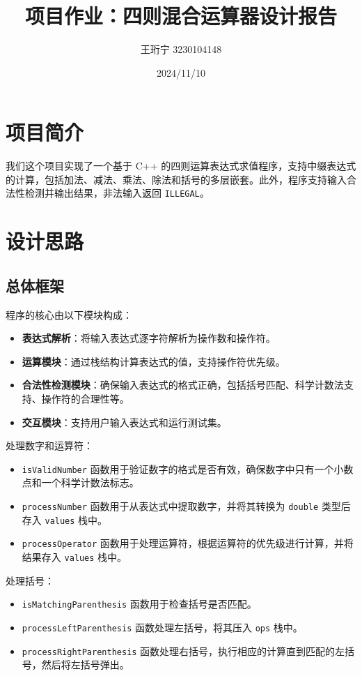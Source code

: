 \documentclass[12pt,a4paper]{article}
\title{项目作业：四则混合运算器设计报告}
\author{王珩宁 3230104148}
\date{2024/11/10}
\begin{document}
\maketitle

\section{项目简介}
我们这个项目实现了一个基于 C++ 的四则运算表达式求值程序，支持中缀表达式的计算，包括加法、减法、乘法、除法和括号的多层嵌套。此外，程序支持输入合法性检测并输出结果，非法输入返回 \texttt{ILLEGAL}。



\section{设计思路}
\subsection{总体框架}
程序的核心由以下模块构成：
\begin{itemize}
    \item \textbf{表达式解析}：将输入表达式逐字符解析为操作数和操作符。
    \item \textbf{运算模块}：通过栈结构计算表达式的值，支持操作符优先级。
    \item \textbf{合法性检测模块}：确保输入表达式的格式正确，包括括号匹配、科学计数法支持、操作符的合理性等。
    \item \textbf{交互模块}：支持用户输入表达式和运行测试集。
\end{itemize}
处理数字和运算符：
\begin{itemize}
    \item \texttt{isValidNumber} 函数用于验证数字的格式是否有效，确保数字中只有一个小数点和一个科学计数法标志。
    \item \texttt{processNumber} 函数用于从表达式中提取数字，并将其转换为 \texttt{double} 类型后存入 \texttt{values} 栈中。
    \item \texttt{processOperator} 函数用于处理运算符，根据运算符的优先级进行计算，并将结果存入 \texttt{values} 栈中。
\end{itemize}

处理括号：
\begin{itemize}
    \item \texttt{isMatchingParenthesis} 函数用于检查括号是否匹配。
    \item \texttt{processLeftParenthesis} 函数处理左括号，将其压入 \texttt{ops} 栈中。
    \item \texttt{processRightParenthesis} 函数处理右括号，执行相应的计算直到匹配的左括号，然后将左括号弹出。
\end{itemize}
\end{document}
